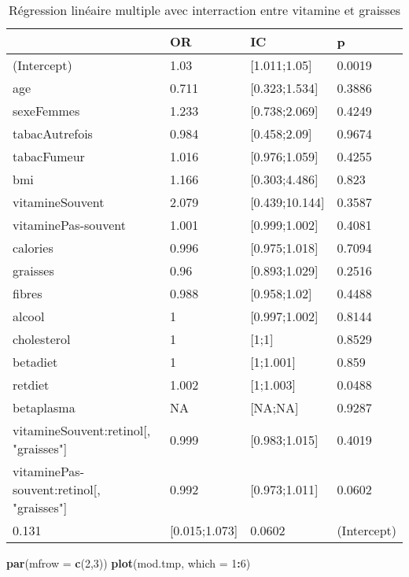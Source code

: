 \documentclass[]{article}
\newenvironment{Shaded}{\begin{snugshade}}{\end{snugshade}}
\newcommand{\KeywordTok}[1]{\textcolor[rgb]{0.13,0.29,0.53}{\textbf{#1}}}
\newcommand{\DataTypeTok}[1]{\textcolor[rgb]{0.13,0.29,0.53}{#1}}
\newcommand{\DecValTok}[1]{\textcolor[rgb]{0.00,0.00,0.81}{#1}}
\newcommand{\OperatorTok}[1]{\textcolor[rgb]{0.81,0.36,0.00}{\textbf{#1}}}
\newcommand{\NormalTok}[1]{#1}
\begin{document}
\begin{table}

\caption{\label{tab:unnamed-chunk-87}Régression linéaire multiple avec interraction entre vitamine et graisses}
\centering
\begin{tabular}[t]{l|l|l|l}
\hline
  & OR & IC & p\\
\hline
\rowcolor[HTML]{BBD2E1}  (Intercept) & 1.03 & [1.011;1.05] & 0.0019\\
\hline
age & 0.711 & [0.323;1.534] & 0.3886\\
\hline
\rowcolor[HTML]{BBD2E1}  sexeFemmes & 1.233 & [0.738;2.069] & 0.4249\\
\hline
tabacAutrefois & 0.984 & [0.458;2.09] & 0.9674\\
\hline
\rowcolor[HTML]{BBD2E1}  tabacFumeur & 1.016 & [0.976;1.059] & 0.4255\\
\hline
bmi & 1.166 & [0.303;4.486] & 0.823\\
\hline
\rowcolor[HTML]{BBD2E1}  vitamineSouvent & 2.079 & [0.439;10.144] & 0.3587\\
\hline
vitaminePas-souvent & 1.001 & [0.999;1.002] & 0.4081\\
\hline
\rowcolor[HTML]{BBD2E1}  calories & 0.996 & [0.975;1.018] & 0.7094\\
\hline
graisses & 0.96 & [0.893;1.029] & 0.2516\\
\hline
\rowcolor[HTML]{BBD2E1}  fibres & 0.988 & [0.958;1.02] & 0.4488\\
\hline
alcool & 1 & [0.997;1.002] & 0.8144\\
\hline
\rowcolor[HTML]{BBD2E1}  cholesterol & 1 & [1;1] & 0.8529\\
\hline
betadiet & 1 & [1;1.001] & 0.859\\
\hline
\rowcolor[HTML]{BBD2E1}  retdiet & 1.002 & [1;1.003] & 0.0488\\
\hline
betaplasma & NA & [NA;NA] & 0.9287\\
\hline
\rowcolor[HTML]{BBD2E1}  vitamineSouvent:retinol[, "graisses"] & 0.999 & [0.983;1.015] & 0.4019\\
\hline
vitaminePas-souvent:retinol[, "graisses"] & 0.992 & [0.973;1.011] & 0.0602\\
\hline
\rowcolor[HTML]{BBD2E1}  0.131 & [0.015;1.073] & 0.0602 & (Intercept)\\
\hline
\end{tabular}
\end{table}

\begin{Shaded}
\begin{Highlighting}[]
\KeywordTok{par}\NormalTok{(}\DataTypeTok{mfrow =} \KeywordTok{c}\NormalTok{(}\DecValTok{2}\NormalTok{,}\DecValTok{3}\NormalTok{))}
\KeywordTok{plot}\NormalTok{(mod.tmp, }\DataTypeTok{which =} \DecValTok{1}\OperatorTok{:}\DecValTok{6}\NormalTok{)}
\end{Highlighting}
\end{Shaded}
\end{document}
